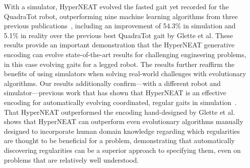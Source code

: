 
With a simulator, HyperNEAT evolved the fasted gait yet recorded for the QuadraTot robot, outperforming nine machine learning algorithms from three previous publications~\cite{yos:clune,glette,haocheng}, including an improvement of 54.3\% in simulation and 5.1\% in reality over the previous best QuadraTot gait by Glette et al. These results provide an important demonstration that the HyperNEAT generative encoding can evolve state-of-the-art results for challenging engineering problems, in this case evolving gaits for a legged robot. The results further reaffirm the benefits of using simulators when solving real-world challenges with evolutionary algorithms. Our results additionally confirm---with a different robot and simulator---previous work that has shown that HyperNEAT is an effective encoding for automatically evolving coordinated, regular gaits in simulation~\cite{clune2009evolving,clune2011performance,yos:clune}. That HyperNEAT outperformed the encoding hand-designed by Glette et al. shows that HyperNEAT can outperform even evolutionary algorithms manually designed to incorporate human domain knowledge regarding which regularities are thought to be beneficial for a problem, demonstrating that automatically discovering regularities can be a superior approach to specifying them, even on problems that are relatively well understood. 
